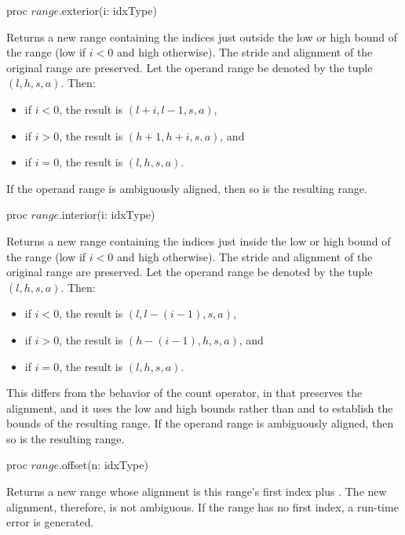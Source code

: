 \begin{protohead}
proc $range$.exterior(i: idxType)
\end{protohead}
\begin{protobody}
Returns a new range containing the indices just outside the low or high bound of
the range (low if $i < 0$ and high otherwise).  The stride and alignment of the
original range are preserved.  Let the operand range
be denoted by the tuple $(l,h,s,a)$.  Then:
\begin{itemize}
\item[] if $i < 0$, the result is $(l+i,l-1,s,a)$,
\item[] if $i > 0$, the result is $(h+1,h+i,s,a)$, and
\item[] if $i = 0$, the result is $(l,h,s,a)$.
\end{itemize}
If the operand range is ambiguously aligned, then so is the resulting range.
\end{protobody}

\begin{protohead}
proc $range$.interior(i: idxType)
\end{protohead}
\begin{protobody}
Returns a new range containing the indices just inside the low or high bound of
the range (low if $i < 0$ and high otherwise).  The stride and alignment of the
original range are preserved.  Let the operand range
be denoted by the tuple $(l,h,s,a)$.  Then:
\begin{itemize}
\item[] if $i < 0$, the result is $(l,l-(i-1),s,a)$,
\item[] if $i > 0$, the result is $(h-(i-1),h,s,a)$, and
\item[] if $i = 0$, the result is $(l,h,s,a)$.
\end{itemize}
This differs from the behavior of the count operator, in that 
preserves the alignment, and it uses the low and high bounds rather
than  and  to establish the bounds of the resulting range.
If the operand range is ambiguously aligned, then so is the resulting range.
\end{protobody}

\begin{protohead}
proc $range$.offset(n: idxType)
\end{protohead}
\label{Range_Offset_Method}
\begin{protobody}
Returns a new range whose alignment is this range's first index plus
. The new alignment, therefore, is not ambiguous.
If the range has no first index, a run-time error is generated.
\end{protobody}

